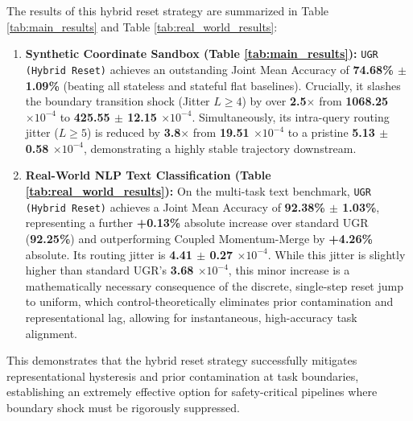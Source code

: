The results of this hybrid reset strategy are summarized in Table \ref{tab:main_results} and Table \ref{tab:real_world_results}:
\begin{enumerate}
    \item \textbf{Synthetic Coordinate Sandbox (Table \ref{tab:main_results}):} \texttt{UGR (Hybrid Reset)} achieves an outstanding Joint Mean Accuracy of \textbf{74.68\% $\pm$ 1.09\%} (beating all stateless and stateful flat baselines). Crucially, it slashes the boundary transition shock (Jitter $L \ge 4$) by over \textbf{2.5$\times$} from \textbf{1068.25 $\times 10^{-4}$} to \textbf{425.55 $\pm$ 12.15 $\times 10^{-4}$}. Simultaneously, its intra-query routing jitter ($L \ge 5$) is reduced by \textbf{3.8$\times$} from \textbf{19.51 $\times 10^{-4}$} to a pristine \textbf{5.13 $\pm$ 0.58 $\times 10^{-4}$}, demonstrating a highly stable trajectory downstream.
    \item \textbf{Real-World NLP Text Classification (Table \ref{tab:real_world_results}):} On the multi-task text benchmark, \texttt{UGR (Hybrid Reset)} achieves a Joint Mean Accuracy of \textbf{92.38\% $\pm$ 1.03\%}, representing a further \textbf{+0.13\%} absolute increase over standard UGR (\textbf{92.25\%}) and outperforming Coupled Momentum-Merge by \textbf{+4.26\%} absolute. Its routing jitter is \textbf{4.41 $\pm$ 0.27 $\times 10^{-4}$}. While this jitter is slightly higher than standard UGR's \textbf{3.68 $\times 10^{-4}$}, this minor increase is a mathematically necessary consequence of the discrete, single-step reset jump to uniform, which control-theoretically eliminates prior contamination and representational lag, allowing for instantaneous, high-accuracy task alignment.
\end{enumerate}
This demonstrates that the hybrid reset strategy successfully mitigates representational hysteresis and prior contamination at task boundaries, establishing an extremely effective option for safety-critical pipelines where boundary shock must be rigorously suppressed.

